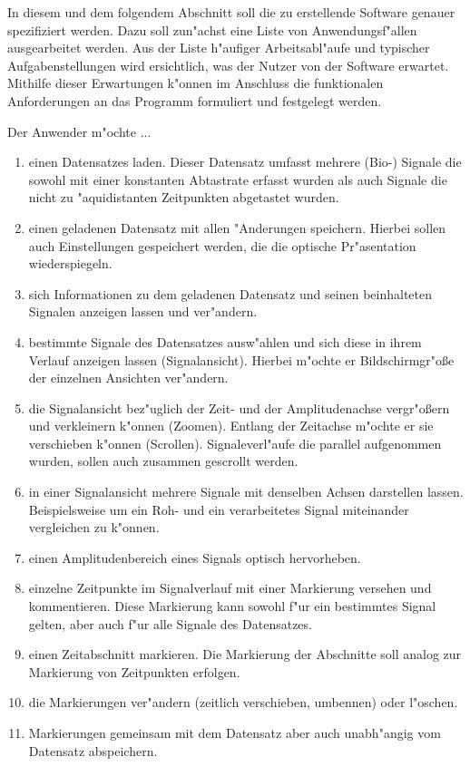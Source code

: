 In diesem und dem folgendem Abschnitt soll die zu erstellende Software genauer spezifiziert werden.
Dazu soll zun"achst eine Liste von Anwendungsf"allen ausgearbeitet werden.
Aus der Liste h"aufiger Arbeitsabl"aufe und typischer Aufgabenstellungen wird ersichtlich, was der Nutzer von der Software erwartet.
Mithilfe dieser Erwartungen k"onnen im Anschluss die funktionalen Anforderungen an das Programm formuliert und festgelegt werden.

\renewcommand{\theenumi}{\alph{enumi}}
\renewcommand{\labelenumi}{\theenumi )}
Der Anwender m"ochte ...
\begin{enumerate}
	\item einen Datensatzes laden.
		  Dieser Datensatz umfasst mehrere (Bio-) Signale die sowohl mit einer konstanten Abtastrate erfasst wurden als auch Signale die nicht zu "aquidistanten Zeitpunkten abgetastet wurden.
	\item einen geladenen Datensatz mit allen "Anderungen speichern.
		  Hierbei sollen auch Einstellungen gespeichert werden, die die optische Pr"asentation wiederspiegeln.
	\item sich Informationen zu dem geladenen Datensatz und seinen beinhalteten Signalen anzeigen lassen und ver"andern.
	\item bestimmte Signale des Datensatzes ausw"ahlen und sich diese in ihrem Verlauf anzeigen lassen (Signalansicht).
		  Hierbei m"ochte er Bildschirmgr"o\ss e der einzelnen Ansichten ver"andern.
	\item die Signalansicht bez"uglich der Zeit- und der Amplitudenachse vergr"o\ss ern und verkleinern k"onnen (Zoomen).
		  Entlang der Zeitachse m"ochte er sie verschieben k"onnen (Scrollen).
		  Signaleverl"aufe die parallel aufgenommen wurden, sollen auch zusammen gescrollt werden.
	\item in einer Signalansicht mehrere Signale mit denselben Achsen darstellen lassen.
		  Beispielsweise um ein Roh- und ein verarbeitetes Signal miteinander vergleichen zu k"onnen.
	\item einen Amplitudenbereich eines Signals optisch hervorheben.
	\item einzelne Zeitpunkte im Signalverlauf mit einer Markierung versehen und kommentieren.
		  Diese Markierung kann sowohl f"ur ein bestimmtes Signal gelten, aber auch f"ur alle Signale des Datensatzes.
	\item einen Zeitabschnitt markieren. Die Markierung der Abschnitte soll analog zur Markierung von Zeitpunkten erfolgen.
	\item die Markierungen ver"andern (zeitlich verschieben, umbennen) oder l"oschen.
	\item Markierungen gemeinsam mit dem Datensatz aber auch unabh"angig vom Datensatz abspeichern.
\end{enumerate}

